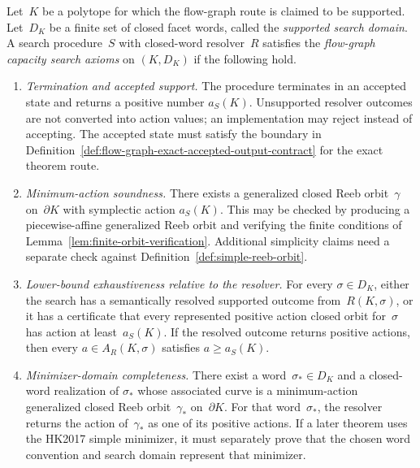 \begin{unverified}
\begin{definition}%
\label{def:flow-graph-capacity-search-axioms}
Let~$K$ be a polytope for which the flow-graph route is claimed to be supported.
Let~$D_K$ be a finite set of closed facet words, called the
\emph{supported search domain}.  A search procedure~$S$ with closed-word
resolver~$R$ satisfies the \emph{flow-graph capacity search axioms} on
$(K,D_K)$ if the following hold.
\begin{enumerate}
  \item \emph{Termination and accepted support.}
    The procedure terminates in an accepted state and returns a positive number
    $a_S(K)$.  Unsupported resolver outcomes are not converted into action
    values; an implementation may reject instead of accepting.  The accepted
    state must satisfy the boundary in
    Definition~\ref{def:flow-graph-exact-accepted-output-contract} for the
    exact theorem route.
  \item \emph{Minimum-action soundness.}
    There exists a generalized closed Reeb orbit~$\gamma$ on~$\partial K$ with
    symplectic action $a_S(K)$.  This may be checked by producing a
    piecewise-affine generalized Reeb orbit and verifying the finite
    conditions of Lemma~\ref{lem:finite-orbit-verification}.  Additional
    simplicity claims need a separate check against
    Definition~\ref{def:simple-reeb-orbit}.
  \item \emph{Lower-bound exhaustiveness relative to the resolver.}
    For every $\sigma \in D_K$, either the search has a semantically resolved
    supported outcome from~$R(K,\sigma)$, or it has a certificate that every
    represented positive action closed orbit for~$\sigma$ has action at
    least~$a_S(K)$.  If the resolved outcome returns positive actions, then
    every $a \in A_R(K,\sigma)$ satisfies $a \geq a_S(K)$.
  \item \emph{Minimizer-domain completeness.}
    There exist a word~$\sigma_*\in D_K$ and a closed-word realization of
    $\sigma_*$ whose associated curve is a minimum-action generalized closed
    Reeb orbit~$\gamma_*$ on~$\partial K$.  For that word~$\sigma_*$, the
    resolver returns the action of~$\gamma_*$ as one of its positive actions.
    If a later theorem uses the HK2017 simple minimizer, it must separately
    prove that the chosen word convention and search domain represent that
    minimizer.
\end{enumerate}
\end{definition}
\end{unverified}

